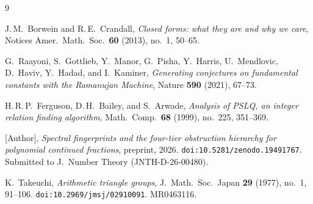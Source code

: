 \documentclass[11pt]{amsart}
\theoremstyle{plain}
\theoremstyle{remark}
\begin{document}
\begin{thebibliography}{9}

J.\,M.~Borwein and R.\,E.~Crandall,
\emph{Closed forms: what they are and why we care},
Notices Amer.\ Math.\ Soc.\ \textbf{60} (2013), no.~1, 50--65.

G.~Raayoni, S.~Gottlieb, Y.~Manor, G.~Pisha, Y.~Harris,
U.~Mendlovic, D.~Haviv, Y.~Hadad, and I.~Kaminer,
\emph{Generating conjectures on fundamental constants with
the Ramanujan Machine},
Nature \textbf{590} (2021), 67--73.

H.\,R.\,P.~Ferguson, D.\,H.~Bailey, and S.~Arwade,
\emph{Analysis of PSLQ, an integer relation finding algorithm},
Math.\ Comp.\ \textbf{68} (1999), no.~225, 351--369.

[Author],
\emph{Spectral fingerprints and the four-tier obstruction
hierarchy for polynomial continued fractions},
preprint, 2026.
\texttt{doi:10.5281/zenodo.19491767}.
Submitted to J.\ Number Theory (JNTH-D-26-00480).

K.~Takeuchi,
\emph{Arithmetic triangle groups},
J.\ Math.\ Soc.\ Japan \textbf{29} (1977), no.~1, 91--106.
\texttt{doi:10.2969/jmsj/02910091}.
MR0463116.

\end{thebibliography}
\end{document}
